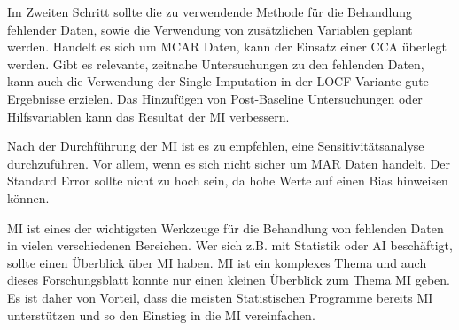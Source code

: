 Im Zweiten Schritt sollte die zu verwendende Methode für die Behandlung fehlender Daten, sowie die Verwendung von zusätzlichen Variablen geplant 
werden. 
Handelt es sich um MCAR Daten, kann der Einsatz einer CCA überlegt werden. Gibt es relevante, zeitnahe Untersuchungen 
zu den fehlenden Daten, kann auch die Verwendung der Single Imputation in der LOCF-Variante gute Ergebnisse erzielen. 
Das Hinzufügen von Post-Baseline Untersuchungen oder Hilfsvariablen kann das Resultat der MI verbessern. 

Nach der Durchführung der MI ist es zu empfehlen, eine Sensitivitätsanalyse durchzuführen. Vor allem, wenn es sich nicht 
sicher um MAR Daten handelt. Der Standard Error sollte nicht zu hoch sein, da hohe Werte auf einen Bias hinweisen können.

MI ist eines der wichtigsten Werkzeuge für die Behandlung von fehlenden Daten in vielen verschiedenen Bereichen. 
Wer sich z.B. mit Statistik oder AI beschäftigt, sollte einen Überblick über MI haben. MI ist ein komplexes Thema und 
auch dieses Forschungsblatt konnte nur einen kleinen Überblick zum Thema MI geben. Es ist daher von Vorteil, dass die 
meisten Statistischen Programme bereits MI unterstützen und so den Einstieg in die MI vereinfachen. 


